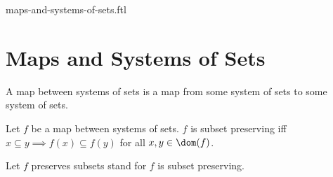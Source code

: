 \documentclass{naproche-library}
\begin{document}
\begin{smodule}{maps-and-systems-of-sets.ftl}

  \section*{Maps and Systems of Sets}

  \begin{definition}[forthel,id=FOUNDATIONS_10_1394550966845440]
    A map between systems of sets is a map from some system of sets to some system of sets.
  \end{definition}

  \begin{definition}[forthel,id=FOUNDATIONS_10_3290499861446656]
    Let $f$ be a map between systems of sets.
    $f$ is subset preserving iff $x \subseteq y \implies f(x) \subseteq f(y)$ for all $x, y \in \dom(f)$.

    Let $f$ preserves subsets stand for $f$ is subset preserving.
  \end{definition}
\end{smodule}
\end{document}
